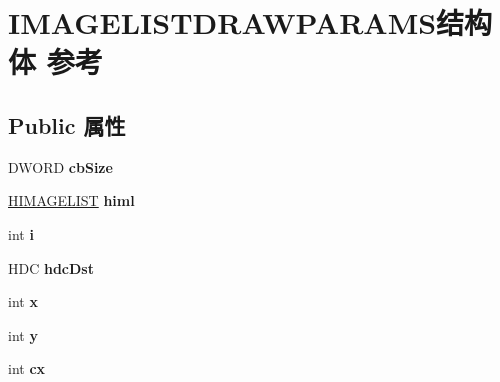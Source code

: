 \hypertarget{struct_i_m_a_g_e_l_i_s_t_d_r_a_w_p_a_r_a_m_s}{}\section{I\+M\+A\+G\+E\+L\+I\+S\+T\+D\+R\+A\+W\+P\+A\+R\+A\+M\+S结构体 参考}
\label{struct_i_m_a_g_e_l_i_s_t_d_r_a_w_p_a_r_a_m_s}
\subsection*{Public 属性}
\begin{DoxyCompactItemize}
\item 
\mbox{\label{struct_i_m_a_g_e_l_i_s_t_d_r_a_w_p_a_r_a_m_s_ae6f8842fe6314c23a5a191667a04aa4e}} 
D\+W\+O\+RD {\bfseries cb\+Size}
\item 
\mbox{\label{struct_i_m_a_g_e_l_i_s_t_d_r_a_w_p_a_r_a_m_s_ab9eee4c2d1a4cf40d7632736300b6471}} 
\hyperlink{struct___i_m_a_g_e_l_i_s_t}{H\+I\+M\+A\+G\+E\+L\+I\+ST} {\bfseries himl}
\item 
\mbox{\label{struct_i_m_a_g_e_l_i_s_t_d_r_a_w_p_a_r_a_m_s_a0cc074f439632c7efe1a9548261d0d1e}} 
int {\bfseries i}
\item 
\mbox{\label{struct_i_m_a_g_e_l_i_s_t_d_r_a_w_p_a_r_a_m_s_aae0998b3bbfdc79fec4d3a6bc1f52ea1}} 
H\+DC {\bfseries hdc\+Dst}
\item 
\mbox{\label{struct_i_m_a_g_e_l_i_s_t_d_r_a_w_p_a_r_a_m_s_a584ef1b6625d97b5a4f4cee4a059ae7c}} 
int {\bfseries x}
\item 
\mbox{\label{struct_i_m_a_g_e_l_i_s_t_d_r_a_w_p_a_r_a_m_s_aa99a5c6ad5de6a1318c5cd471d785b9e}} 
int {\bfseries y}
\item 
\mbox{\label{struct_i_m_a_g_e_l_i_s_t_d_r_a_w_p_a_r_a_m_s_ab0f7b3e2270c1092eb99b0fa8a689298}} 
int {\bfseries cx}
\item 

\end{DoxyCompactItemize}
